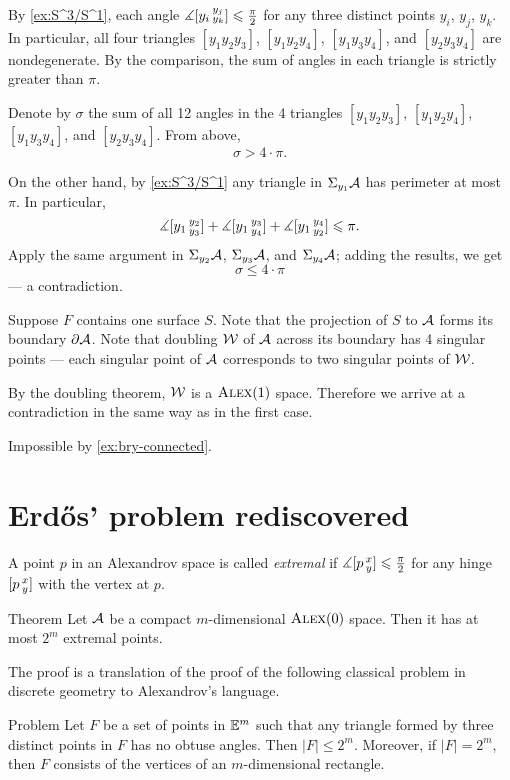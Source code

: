 By \ref{ex:S^3/S^1}, each angle $\measuredangle[y_i\,{}^{y_j}_{y_k}]\leqslant \tfrac\pi2$ for any three distinct points 
$y_i$, $y_j$, $y_k$.
In particular, all four triangles $[y_1y_2y_3]$, $[y_1y_2y_4]$, $[y_1y_3y_4]$, and $[y_2y_3y_4]$ are nondegenerate.
By the comparison, the sum of angles in each triangle is strictly greater than $\pi$.

Denote by $\sigma$ the sum of all 12 angles in the 4 triangles $[y_1y_2y_3]$, $[y_1y_2y_4]$, $[y_1y_3y_4]$, and $[y_2y_3y_4]$.
From above,
\[\sigma>4\cdot\pi.\]

On the other hand, by \ref{ex:S^3/S^1} any triangle in $\Sigma_{y_1}\mathcal{A}$ has perimeter at most $\pi$.
In particular, 
\[\measuredangle[y_1\,{}^{y_2}_{y_3}]+\measuredangle[y_1\,{}^{y_3}_{y_4}]+\measuredangle[y_1\,{}^{y_4}_{y_2}]\leqslant \pi.\]
Apply the same argument in $\Sigma_{y_2}\mathcal{A}$, $\Sigma_{y_3}\mathcal{A}$, and $\Sigma_{y_4}\mathcal{A}$;
adding the results, we get 
\[\sigma\le 4\cdot\pi\]
--- a contradiction.

Suppose $F$ contains one surface $S$.
Note that the projection of $S$ to $\mathcal{A}$ forms its boundary $\partial \mathcal{A}$.
Note that doubling $\mathcal{W}$ of $\mathcal{A}$ across its boundary has 4 singular points --- each singular point of $\mathcal{A}$ corresponds to two singular points of $\mathcal{W}$.

By the doubling theorem, $\mathcal{W}$ is a $\textsc{Alex}(1)$ space.
Therefore we arrive at a contradiction in the same way as in the first case.

 Impossible by \ref{ex:bry-connected}.
\qeds

\section{Erdős' problem rediscovered}

A point $p$ in an Alexandrov space is called \emph{extremal} if $\measuredangle[p\,{}^{x}_{y}]\leqslant \tfrac\pi2$ for any hinge $[p\,{}^{x}_{y}]$ with the vertex at $p$. 

\begin{thm}{Theorem}\label{thm:extr-point}
Let $\mathcal{A}$ be a compact $m$-dimensional $\textsc{Alex}(0)$ space.
Then it has at most $2^m$ extremal points.
\end{thm}

The proof is a translation of the proof of the following classical problem in discrete geometry to Alexandrov's language.

\begin{thm}{Problem}
Let $F$ be a set of points in $\mathbb{E}^m$ such that any triangle formed by three distinct points in $F$ has no obtuse angles.
Then  $|F|\le2^m$.
Moreover, if $|F|=2^m$, then $F$ consists of the vertices of an $m$-dimensional rectangle.
\end{thm}

